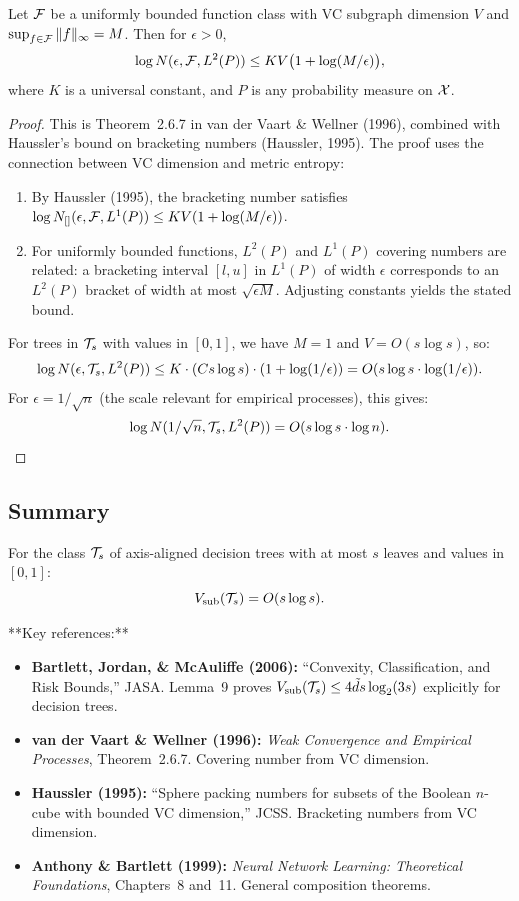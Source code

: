 \documentclass[12pt]{article}
\begin{document}
\begin{corollary}
\label{cor:covering-app}
Let $\mathcal{F}$ be a uniformly bounded function class with VC subgraph dimension $V$ and $\sup_{f \in \mathcal{F}} \|f\|_\infty = M$. Then for $\epsilon > 0$,
\[
\log N(\epsilon, \mathcal{F}, L^2(P)) \le K V \bigl( 1 + \log(M/\epsilon) \bigr),
\]
where $K$ is a universal constant, and $P$ is any probability measure on $\mathcal{X}$.
\end{corollary}

\begin{proof}
This is Theorem~2.6.7 in van der Vaart \& Wellner (1996), combined with Haussler's bound on bracketing numbers (Haussler, 1995). The proof uses the connection between VC dimension and metric entropy:
\begin{enumerate}
\item By Haussler (1995), the bracketing number satisfies $\log N_{[]}(\epsilon, \mathcal{F}, L^1(P)) \le K V (1 + \log(M/\epsilon))$.
\item For uniformly bounded functions, $L^2(P)$ and $L^1(P)$ covering numbers are related: a bracketing interval $[l, u]$ in $L^1(P)$ of width $\epsilon$ corresponds to an $L^2(P)$ bracket of width at most $\sqrt{\epsilon M}$. Adjusting constants yields the stated bound.
\end{enumerate}

For trees in $\mathcal{T}_s$ with values in $[0,1]$, we have $M = 1$ and $V = O(s \log s)$, so:
\[
\log N(\epsilon, \mathcal{T}_s, L^2(P)) \le K \cdot (Cs \log s) \cdot (1 + \log(1/\epsilon)) = O(s \log s \cdot \log(1/\epsilon)).
\]
For $\epsilon = 1/\sqrt{n}$ (the scale relevant for empirical processes), this gives:
\[
\log N(1/\sqrt{n}, \mathcal{T}_s, L^2(P)) = O(s \log s \cdot \log n).
\]
\end{proof}

\subsection{Summary}

For the class $\mathcal{T}_s$ of axis-aligned decision trees with at most $s$ leaves and values in $[0,1]$:
\[
V_{\text{sub}}(\mathcal{T}_s) = O(s \log s).
\]

**Key references:**
\begin{itemize}
\item \textbf{Bartlett, Jordan, \& McAuliffe (2006):} ``Convexity, Classification, and Risk Bounds,'' JASA. Lemma~9 proves $V_{\text{sub}}(\mathcal{T}_s) \le 4\tilde{d} s \log_2(3s)$ explicitly for decision trees.
\item \textbf{van der Vaart \& Wellner (1996):} \emph{Weak Convergence and Empirical Processes}, Theorem~2.6.7. Covering number from VC dimension.
\item \textbf{Haussler (1995):} ``Sphere packing numbers for subsets of the Boolean $n$-cube with bounded VC dimension,'' JCSS. Bracketing numbers from VC dimension.
\item \textbf{Anthony \& Bartlett (1999):} \emph{Neural Network Learning: Theoretical Foundations}, Chapters~8 and~11. General composition theorems.
\end{itemize}
\end{document}
